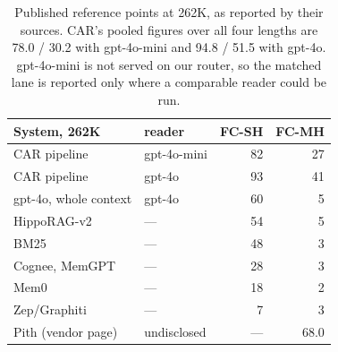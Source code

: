 \documentclass[11pt]{article}
\begin{document}
\begin{table}[t]
\centering
\footnotesize

\caption{Substring exact match on FactConsolidation. Rows name their
reader; \emph{none} is the resolver's own output. The 6K columns are the dev
split; 32K--262K were run once per configuration. Pooled is the mean of the
four sizes, as CAR reports its headline.}
\label{tab:mab}
\end{table}

\begin{table}[t]
\centering
\footnotesize

\caption{Best-of-N against selected-of-N on the multi-hop haystacks: plan
recall@N / execution success@N out of 100, no reader. Sets enter in the
lane's order; every set is also executed in every order of its relations.}
\label{tab:mab-nbest}
\end{table}

\begin{table}[t]
\centering
\footnotesize

\caption{The ceiling of a consistent version policy per multi-hop haystack,
out of 100. A contested key is one that two questions need in different
versions; the oracle row picks one version per key to satisfy the most
questions, the latest-wins row is the policy every row of
Table~\ref{tab:mab} uses.}
\label{tab:mab-ceiling}
\end{table}

\begin{table}[t]
\centering
\small
\begin{tabular}{llrr}
\toprule
System, 262K & reader & FC-SH & FC-MH \\
\midrule
CAR pipeline \cite{car} & gpt-4o-mini & 82 & 27 \\
CAR pipeline \cite{car} & gpt-4o & 93 & 41 \\
gpt-4o, whole context \cite{car} & gpt-4o & 60 & 5 \\
HippoRAG-v2 \cite{car} & --- & 54 & 5 \\
BM25 \cite{car} & --- & 48 & 3 \\
Cognee, MemGPT \cite{car} & --- & 28 & 3 \\
Mem0 \cite{car} & --- & 18 & 2 \\
Zep/Graphiti \cite{car} & --- & 7 & 3 \\
Pith (vendor page) \cite{pith} & undisclosed & --- & 68.0 \\
\bottomrule
\end{tabular}
\caption{Published reference points at 262K, as reported by their sources.
CAR's pooled figures over all four lengths are 78.0 / 30.2 with gpt-4o-mini
and 94.8 / 51.5 with gpt-4o. gpt-4o-mini is not served on our router, so the
matched lane is reported only where a comparable reader could be run.}
\label{tab:mabref}
\end{table}
\end{document}
